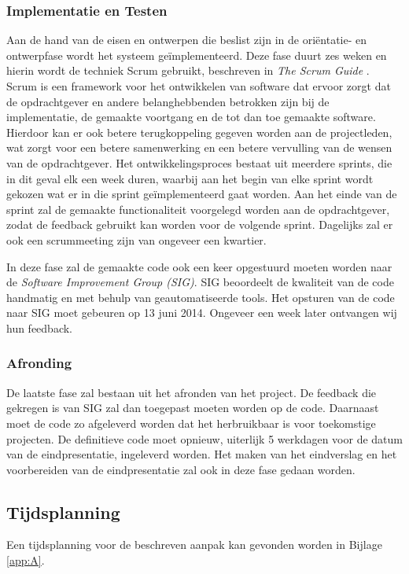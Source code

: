 \subsubsection{Implementatie en Testen}
\label{subsubsec:testen}
Aan de hand van de eisen en ontwerpen die beslist zijn in de ori\"entatie- en ontwerpfase wordt het systeem ge\"implementeerd. Deze fase duurt zes weken en hierin wordt de techniek Scrum gebruikt, beschreven in \emph{The Scrum Guide} \cite{schwaber2011}. Scrum is een framework voor het ontwikkelen van software dat ervoor zorgt dat de opdrachtgever en andere belanghebbenden betrokken zijn bij de implementatie, de gemaakte voortgang en de tot dan toe gemaakte software. Hierdoor kan er ook betere terugkoppeling gegeven worden aan de projectleden, wat zorgt voor een betere samenwerking en een betere vervulling van de wensen van de opdrachtgever. Het ontwikkelingsproces bestaat uit meerdere sprints, die in dit geval elk een week duren, waarbij aan het begin van elke sprint wordt gekozen wat er in die sprint ge\"implementeerd gaat worden. Aan het einde van de sprint zal de gemaakte functionaliteit voorgelegd worden aan de opdrachtgever, zodat de feedback gebruikt kan worden voor de volgende sprint. Dagelijks zal er ook een scrummeeting zijn van ongeveer een kwartier.

In deze fase zal de gemaakte code ook een keer opgestuurd moeten worden naar de \emph{Software Improvement Group (SIG)}. SIG beoordeelt de kwaliteit van de code handmatig en met behulp van geautomatiseerde tools. Het opsturen van de code naar SIG moet gebeuren op 13 juni 2014. Ongeveer een week later ontvangen wij hun feedback.

\subsubsection{Afronding}
De laatste fase zal bestaan uit het afronden van het project. De feedback die gekregen is van SIG zal dan toegepast moeten worden op de code. Daarnaast moet de code zo afgeleverd worden dat het herbruikbaar is voor toekomstige projecten. De definitieve code moet opnieuw, uiterlijk 5 werkdagen voor de datum van de eindpresentatie, ingeleverd worden. Het maken van het eindverslag en het voorbereiden van de eindpresentatie zal ook in deze fase gedaan worden.

\subsection{Tijdsplanning}
Een tijdsplanning voor de beschreven aanpak kan gevonden worden in Bijlage \ref{app:A}.
